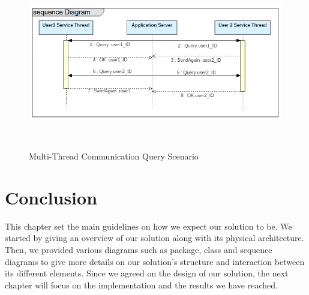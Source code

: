 \begin{figure}[!ht]
\begin{center}
\includegraphics[width=11.5cm,height=7.5cm]{chapter4/SequenceDiagram3.png}
\end{center}
\caption{Multi-Thread Communication Query Scenario}
\label{seq3}
\end{figure}


\section*{Conclusion}

This chapter set the main guidelines on how we expect our solution to be. We started by giving an overview of our solution along with its physical architecture. Then, we provided various diagrams such as package, class and sequence diagrams to give more details on our solution's structure and interaction between its different elements. Since we agreed on the design of our solution, the next chapter will focus on the implementation
and the results we have reached.